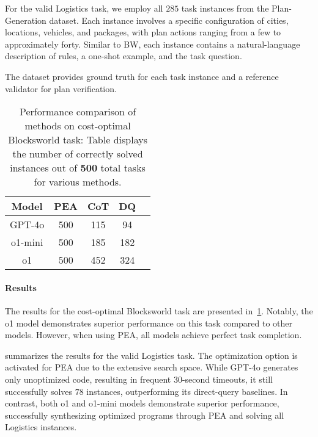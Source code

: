 For the valid Logistics task, we employ all $285$ task instances from the Plan-Generation dataset. Each instance involves a specific configuration of cities, locations, vehicles, and packages, with plan actions ranging from a few to approximately forty. Similar to BW, each instance contains a natural-language description of rules, a one-shot example, and the task question.

The dataset provides ground truth for each task instance and a reference validator for plan verification.


\begin{table}
\begin{center}
    \caption{Performance comparison of methods on cost-optimal Blocksworld task: Table displays the number of correctly solved instances out of \textbf{500} total tasks for various methods.}
    \begin{tabular}{ ccccc } 
        \toprule \bf Model & \bf PEA & \bf CoT & \bf DQ  \\
        \hline GPT-4o & 500 & 115 & 94  \\  
        \hline o1-mini & 500 & 185 &  182 \\  
        \hline o1 & 500 & 452 &  324  \\ 
        \bottomrule
    \end{tabular}
    \label{tab:bw}
\end{center}
\vspace{-0.3cm}
\end{table}

\paragraph{Results} The results for the cost-optimal Blocksworld task are presented in~\cref{tab:bw}. Notably, the o1 model demonstrates superior performance on this task compared to other models. However, when using PEA, all models achieve perfect task completion.

 summarizes the results for the valid Logistics task. The optimization option is activated for PEA due to the extensive search space. While GPT-4o generates only unoptimized code, resulting in frequent $30$-second timeouts, it still successfully solves $78$ instances, outperforming its direct-query baselines. In contrast, both o1 and o1-mini models demonstrate superior performance, successfully synthesizing optimized programs through PEA and solving all Logistics instances.



